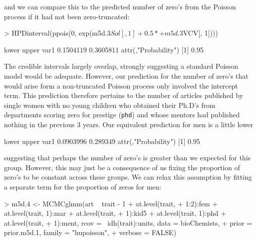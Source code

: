 \documentclass{article}
\begin{document}
and we can compare this to the predicted number of zero's from the Poisson process if it had not been zero-truncated:

\begin{Schunk}
\begin{Sinput}
> HPDinterval(ppois(0, exp(m5d.3$Sol[, 1] + 0.5 * 
+     m5d.3$VCV[, 1])))
\end{Sinput}
\begin{Soutput}
         lower     upper
var1 0.1504119 0.3605811
attr(,"Probability")
[1] 0.95
\end{Soutput}
\end{Schunk}

The credible intervals largely overlap, strongly suggesting a standard Poisson model would be adequate. However, our prediction for the number of zero's that would arise form a non-truncated Poisson process only involved the intercept term. This prediction therefore pertains to the number of articles published by single women with no young children who obtained their Ph.D's from departments scoring zero for prestige (\texttt{phd}) and whose mentors had published nothing in the previous 3 years.  Our equivalent prediction for men is a little lower 

\begin{Schunk}
\begin{Soutput}
         lower    upper
var1 0.0903996 0.289349
attr(,"Probability")
[1] 0.95
\end{Soutput}
\end{Schunk}

suggesting that perhaps the number of zero's is greater than we expected for this group. However, this may just be a consequence of us fixing the proportion of zero's to be constant across these groups. We can relax this assumption by fitting a separate term for the proportion of zeros for men:

\begin{Schunk}
\begin{Sinput}
> m5d.4 <- MCMCglmm(art ~ trait - 1 + at.level(trait, 
+     1:2):fem + at.level(trait, 1):mar + at.level(trait, 
+     1):kid5 + at.level(trait, 1):phd + at.level(trait, 
+     1):ment, rcov = ~idh(trait):units, data = bioChemists, 
+     prior = prior.m5d.1, family = "hupoisson", 
+     verbose = FALSE)
\end{Sinput}
\end{Schunk}
\end{document}
